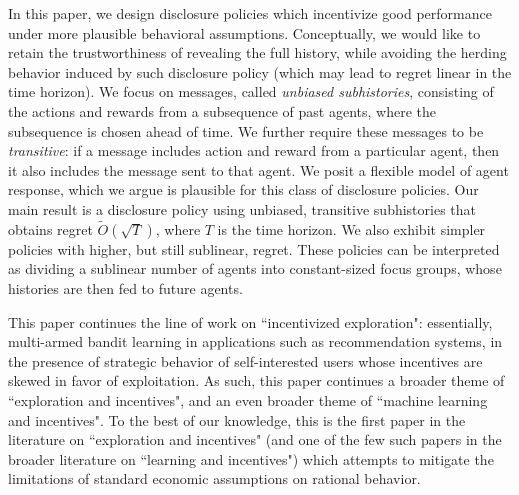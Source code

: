 \documentclass[11pt,letterpaper]{article}
\begin{document}
In this paper, we design disclosure policies which incentivize good performance under more plausible behavioral assumptions. Conceptually, we would like to retain the trustworthiness of revealing the full history, while avoiding the herding behavior induced by such disclosure policy (which may lead to regret linear in the time horizon). We focus on messages, called {\em unbiased subhistories}, consisting of the actions and rewards from a subsequence of past agents, where the subsequence is chosen ahead of time. We further require these messages to be \emph{transitive}: if a message includes action and reward from a particular agent, then it also includes the message sent to that agent. We posit a flexible model of agent response, which we argue is plausible for this class of disclosure policies. Our main result is a disclosure policy using unbiased, transitive subhistories that obtains regret $\tilde{O}(\sqrt{T})$, where $T$ is the time horizon.  We also exhibit simpler policies with higher, but still sublinear, regret.  These policies can be interpreted as dividing a sublinear number of agents into constant-sized focus groups, whose histories are then fed to future agents.

\vspace{2mm}

This paper continues the line of work on ``incentivized exploration": essentially, multi-armed bandit learning in applications such as recommendation systems, in the presence of strategic behavior of self-interested users whose incentives are skewed in favor of exploitation. As such, this paper continues a broader theme of ``exploration and incentives", and an even broader theme of ``machine learning and incentives". To the best of our knowledge, this is the first paper in the literature on ``exploration and incentives" (and one of the few such papers in the broader literature on ``learning and incentives") which attempts to mitigate the limitations of standard economic assumptions on rational behavior.
\end{document}
